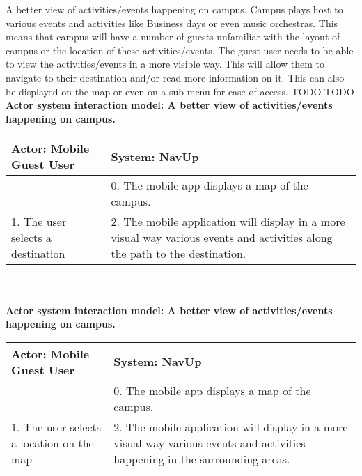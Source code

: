 \FuncReq
{A better view of activities/events happening on campus.}
{Campus plays host to various events and activities like Business days or even music orchestras. This means that campus will have a number of guests unfamiliar with the layout of campus or the location of these activities/events. The guest user needs to be able to view the activities/events in a more visible way. This will allow them to navigate to their destination and/or read more information on it. This can also be displayed on the map or even on a sub-menu for ease of access.}
{TODO}
{TODO}
\\
\textbf{Actor system interaction model: A better view of activities/events happening on campus.}\\
\begin{tabular}{ | p{6cm} | p{6cm} |}
\hline
Actor: Mobile Guest User & System: NavUp \\ \hline
& 0. The mobile app displays a map of the campus.\\ \hline
1. The user selects a destination & 2. The mobile application will display in a more visual way various events and activities along the path to the destination.\\ \hline
\end{tabular}
\\
\bigskip
\\    
\textbf{Actor system interaction model: A better view of activities/events happening on campus. }\\
\begin{tabular}{ | p{6cm} | p{6cm} |}
\hline
Actor: Mobile Guest User & System: NavUp \\ \hline
& 0. The mobile app displays a map of the campus.\\ \hline
1. The user selects a location on the map & 2. The mobile application will display in a more visual way various events and activities happening in the surrounding areas.\\ \hline
\end{tabular}
\\
\bigskip

